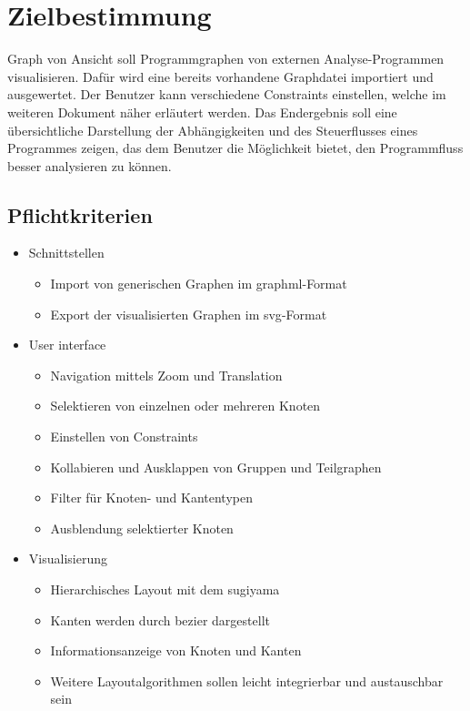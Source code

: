 \chapter{Zielbestimmung}

Graph von Ansicht soll Programmgraphen von externen Analyse-Programmen visualisieren. Dafür wird eine bereits vorhandene Graphdatei importiert und ausgewertet. Der Benutzer kann verschiedene Constraints einstellen, welche im weiteren Dokument näher erläutert werden. 
Das Endergebnis soll eine übersichtliche Darstellung der Abhängigkeiten und des Steuerflusses eines Programmes zeigen, das dem Benutzer die Möglichkeit bietet, den Programmfluss besser analysieren zu können.

\section{Pflichtkriterien}

\begin{itemize}
\item Schnittstellen
\begin{itemize}
\item Import von generischen Graphen im \gls{graphml}-Format
\item Export der visualisierten Graphen im \gls{svg}-Format
\end{itemize}
\item User interface
\begin{itemize}
\item Navigation mittels Zoom und Translation
\item Selektieren von einzelnen oder mehreren Knoten
\item Einstellen von Constraints
\item Kollabieren und Ausklappen von Gruppen und Teilgraphen
\item Filter für Knoten- und Kantentypen
\item Ausblendung selektierter Knoten
\end{itemize}
\item Visualisierung
\begin{itemize}
\item Hierarchisches Layout mit dem \gls{sugiyama}
\item Kanten werden durch \gls{bezier} dargestellt
\item Informationsanzeige von Knoten und Kanten
\item Weitere Layoutalgorithmen sollen leicht integrierbar und austauschbar sein
\end{itemize}
\end{itemize}

